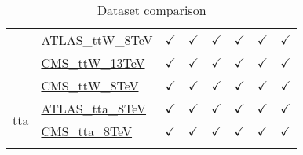 \documentclass{article}
\begin{document}
\begin{longtable}{|c|l|c|c|c|c|c|c|}
 & \href{https://arxiv.org}{ATLAS_ttW_8TeV}  & $\checkmark$ & $\checkmark$ & $\checkmark$ & $\checkmark$ & $\checkmark$ & $\checkmark$\\ \cline{2-8}
 & \href{https://arxiv.org}{CMS_ttW_13TeV}  & $\checkmark$ & $\checkmark$ & $\checkmark$ & $\checkmark$ & $\checkmark$ & $\checkmark$\\ \cline{2-8}
 & \href{https://arxiv.org}{CMS_ttW_8TeV}  & $\checkmark$ & $\checkmark$ & $\checkmark$ & $\checkmark$ & $\checkmark$ & $\checkmark$
\\ \hline
\multirow{2}{*}{tta}
 & \href{https://arxiv.org}{ATLAS_tta_8TeV}  & $\checkmark$ & $\checkmark$ & $\checkmark$ & $\checkmark$ & $\checkmark$ & $\checkmark$\\ \cline{2-8}
 & \href{https://arxiv.org}{CMS_tta_8TeV}  & $\checkmark$ & $\checkmark$ & $\checkmark$ & $\checkmark$ & $\checkmark$ & $\checkmark$
\\ \hline
\caption{Dataset comparison}
\end{longtable}
\end{document}
